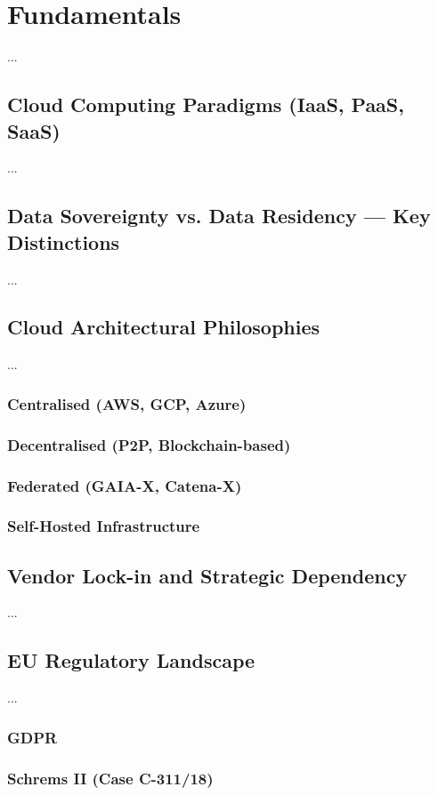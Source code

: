 \chapter{Fundamentals}
...

\section{Cloud Computing Paradigms (IaaS, PaaS, SaaS)}
...

\section{Data Sovereignty vs. Data Residency — Key Distinctions}
...

\section{Cloud Architectural Philosophies}
...
\subsection{Centralised (AWS, GCP, Azure)}
\subsection{Decentralised (P2P, Blockchain-based)}
\subsection{Federated (GAIA-X, Catena-X)}
\subsection{Self-Hosted Infrastructure}

\section{Vendor Lock-in and Strategic Dependency}
...

\section{EU Regulatory Landscape}
...
\subsection{GDPR}
\subsection{Schrems II (Case C-311/18)}
